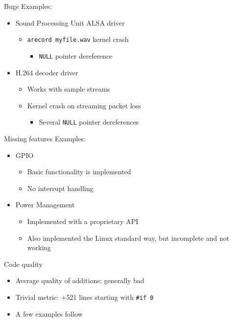 \documentclass[xetex,table]{beamer}
\begin{document}
\begin{frame}{Bugs}
  Examples:
  \begin{itemize}
  \item Sound Processing Unit ALSA driver
    \begin{itemize}
    \item \texttt{arecord myfile.wav} \textrightarrow{} kernel crash
      \begin{itemize}
      \item \texttt{NULL} pointer dereference
      \end{itemize}
    \end{itemize}
  \item H.264 decoder driver
    \begin{itemize}
    \item Works with sample streams
    \item Kernel crash on streaming packet loss
      \begin{itemize}
      \item Several \texttt{NULL} pointer dereferences
      \end{itemize}
    \end{itemize}
  \end{itemize}
\end{frame}

\begin{frame}{Missing features}
  Examples:
  \begin{itemize}
  \item GPIO
    \begin{itemize}
    \item Basic functionality is implemented
    \item No interrupt handling
    \end{itemize}
  \item Power Management
    \begin{itemize}
    \item Implemented with a proprietary API
    \item Also implemented the Linux standard way, but incomplete and
      not working
    \end{itemize}
  \end{itemize}
\end{frame}

\begin{frame}{Code quality}
  \begin{itemize}
  \item Average quality of additions: generally bad
  \item Trivial metric: +521 lines starting with \texttt{\#if 0}
  \item A few examples follow
  \end{itemize}
\end{frame}
\end{document}
